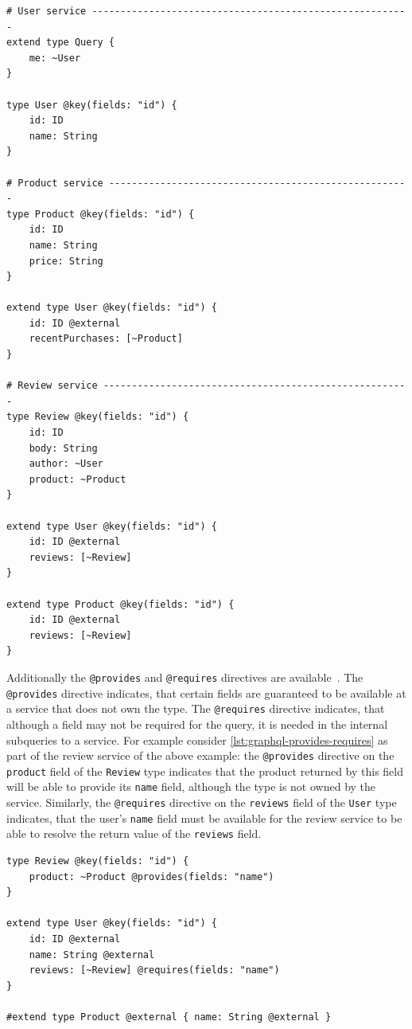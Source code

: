 \begin{lstlisting}[language=graphqls, caption={Concern-based separation with Apollo Federation~\cite{MDG}}, label={lst:graphql-concern-separation}]
# User service --------------------------------------------------------
extend type Query {
    me: ~User
}

type User @key(fields: "id") {
    id: ID
    name: String
}

# Product service -----------------------------------------------------
type Product @key(fields: "id") {
    id: ID
    name: String
    price: String
}

extend type User @key(fields: "id") {
    id: ID @external
    recentPurchases: [~Product]
}

# Review service ------------------------------------------------------
type Review @key(fields: "id") {
    id: ID
    body: String
    author: ~User
    product: ~Product
}

extend type User @key(fields: "id") {
    id: ID @external
    reviews: [~Review]
}

extend type Product @key(fields: "id") {
    id: ID @external
    reviews: [~Review]
}
\end{lstlisting}

Additionally the \texttt{@provides} and \texttt{@requires} directives are available~\cite{MDGa}.
The \texttt{@provides} directive indicates, that certain fields are guaranteed to be available at a service that does not own the type.
The \texttt{@requires} directive indicates, that although a field may not be required for the query, it is needed in the internal subqueries to a service.
For example consider \autoref{lst:graphql-provides-requires} as part of the review service of the above example: the \texttt{@provides} directive on the \texttt{product} field of the \texttt{Review} type indicates that the product returned by this field will be able to provide its \texttt{name} field, although the type is not owned by the service.
Similarly, the \texttt{@requires} directive on the \texttt{reviews} field of the \texttt{User} type indicates, that the user's \texttt{name} field must be available for the review service to be able to resolve the return value of the \texttt{reviews} field.

\begin{lstlisting}[caption={\texttt{@provides} and \texttt{@requires} Directives of Apollo Federation~\cite{MDG}}, language=graphqls, label={lst:graphql-provides-requires}]
type Review @key(fields: "id") {
    product: ~Product @provides(fields: "name")
}

extend type User @key(fields: "id") {
    id: ID @external
    name: String @external
    reviews: [~Review] @requires(fields: "name")
}

#extend type Product @external { name: String @external }
\end{lstlisting}

